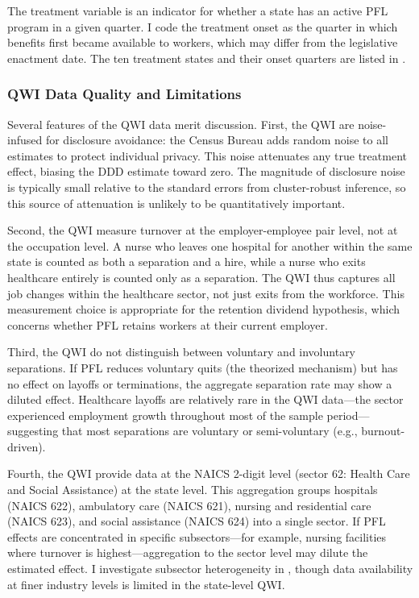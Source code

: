 \documentclass[12pt]{article}
\begin{document}
The treatment variable is an indicator for whether a state has an active PFL program in a given quarter. I code the treatment onset as the quarter in which benefits first became available to workers, which may differ from the legislative enactment date. The ten treatment states and their onset quarters are listed in .

\subsubsection*{QWI Data Quality and Limitations} Several features of the QWI data merit discussion. First, the QWI are noise-infused for disclosure avoidance: the Census Bureau adds random noise to all estimates to protect individual privacy. This noise attenuates any true treatment effect, biasing the DDD estimate toward zero. The magnitude of disclosure noise is typically small relative to the standard errors from cluster-robust inference, so this source of attenuation is unlikely to be quantitatively important.

Second, the QWI measure turnover at the employer-employee pair level, not at the occupation level. A nurse who leaves one hospital for another within the same state is counted as both a separation and a hire, while a nurse who exits healthcare entirely is counted only as a separation. The QWI thus captures all job changes within the healthcare sector, not just exits from the workforce. This measurement choice is appropriate for the retention dividend hypothesis, which concerns whether PFL retains workers at their current employer.

Third, the QWI do not distinguish between voluntary and involuntary separations. If PFL reduces voluntary quits (the theorized mechanism) but has no effect on layoffs or terminations, the aggregate separation rate may show a diluted effect. Healthcare layoffs are relatively rare in the QWI data---the sector experienced employment growth throughout most of the sample period---suggesting that most separations are voluntary or semi-voluntary (e.g., burnout-driven).

Fourth, the QWI provide data at the NAICS 2-digit level (sector 62: Health Care and Social Assistance) at the state level. This aggregation groups hospitals (NAICS 622), ambulatory care (NAICS 621), nursing and residential care (NAICS 623), and social assistance (NAICS 624) into a single sector. If PFL effects are concentrated in specific subsectors---for example, nursing facilities where turnover is highest---aggregation to the sector level may dilute the estimated effect. I investigate subsector heterogeneity in , though data availability at finer industry levels is limited in the state-level QWI.
\end{document}
